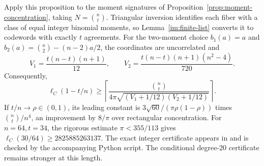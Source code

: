 Apply this proposition to the moment signatures of
Proposition~\ref{prop:moment-concentration}, taking $N=\binom nt$.
Triangular inversion identifies each fiber with a class of equal
integer binomial moments, so Lemma~\ref{im:finite-list} converts it
to codewords with exactly $t$ agreements. For the two-moment choice
$b_1(a)=a$ and $b_2(a)=\binom a2-(n-2)a/2$, the coordinates are
uncorrelated and
\[
 V_1=\frac{t(n-t)(n+1)}{12},\qquad
 V_2=\frac{t(n-t)(n+1)(n^2-4)}{720}.
\]
Consequently,
\[
 \ell_C(1-t/n)\ge
 \left\lceil\frac{\binom nt}
 {4\pi\sqrt{(V_1+1/12)(V_2+1/12)}}\right\rceil.
\]
If $t/n\to\rho\in(0,1)$, its leading constant is
$3\sqrt{60}/(\pi\rho(1-\rho))$ times $\binom nt/n^4$,
an improvement by $8/\pi$ over rectangular concentration.
For $n=64,t=34$, the rigorous estimate $\pi<355/113$ gives
$\ell_C(30/64)\ge2825885263137$.
The exact integer certificate appears in
 and is checked
by the accompanying Python script. The conditional degree-$20$
certificate remains stronger at this length.
